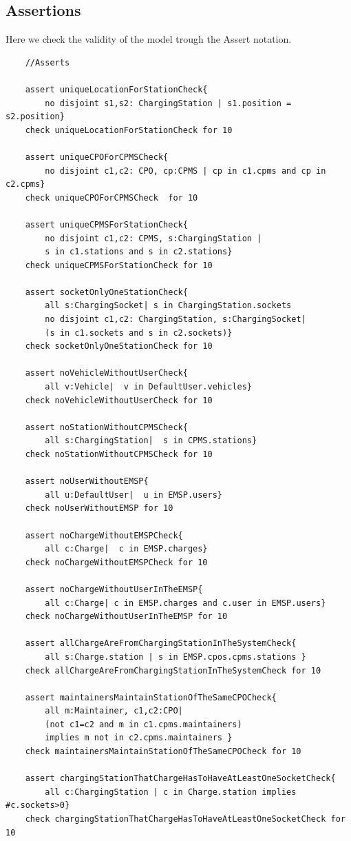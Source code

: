 \subsection{Assertions}
Here we check the validity of the model trough the Assert notation.
\begin{verbatim}
    //Asserts

    assert uniqueLocationForStationCheck{
        no disjoint s1,s2: ChargingStation | s1.position = s2.position}
    check uniqueLocationForStationCheck for 10
    
    assert uniqueCPOForCPMSCheck{
        no disjoint c1,c2: CPO, cp:CPMS | cp in c1.cpms and cp in c2.cpms}
    check uniqueCPOForCPMSCheck  for 10
    
    assert uniqueCPMSForStationCheck{
        no disjoint c1,c2: CPMS, s:ChargingStation | 
        s in c1.stations and s in c2.stations}
    check uniqueCPMSForStationCheck for 10
    
    assert socketOnlyOneStationCheck{
        all s:ChargingSocket| s in ChargingStation.sockets
        no disjoint c1,c2: ChargingStation, s:ChargingSocket|
        (s in c1.sockets and s in c2.sockets)}
    check socketOnlyOneStationCheck for 10
    
    assert noVehicleWithoutUserCheck{
        all v:Vehicle|  v in DefaultUser.vehicles}
    check noVehicleWithoutUserCheck for 10
    
    assert noStationWithoutCPMSCheck{
        all s:ChargingStation|  s in CPMS.stations}
    check noStationWithoutCPMSCheck for 10
    
    assert noUserWithoutEMSP{
        all u:DefaultUser|  u in EMSP.users}
    check noUserWithoutEMSP for 10
    
    assert noChargeWithoutEMSPCheck{
        all c:Charge|  c in EMSP.charges}
    check noChargeWithoutEMSPCheck for 10
    
    assert noChargeWithoutUserInTheEMSP{
        all c:Charge| c in EMSP.charges and c.user in EMSP.users}
    check noChargeWithoutUserInTheEMSP for 10
    
    assert allChargeAreFromChargingStationInTheSystemCheck{
        all s:Charge.station | s in EMSP.cpos.cpms.stations }
    check allChargeAreFromChargingStationInTheSystemCheck for 10
    
    assert maintainersMaintainStationOfTheSameCPOCheck{
        all m:Maintainer, c1,c2:CPO|
        (not c1=c2 and m in c1.cpms.maintainers) 
        implies m not in c2.cpms.maintainers }
    check maintainersMaintainStationOfTheSameCPOCheck for 10
    
    assert chargingStationThatChargeHasToHaveAtLeastOneSocketCheck{
        all c:ChargingStation | c in Charge.station implies #c.sockets>0}
    check chargingStationThatChargeHasToHaveAtLeastOneSocketCheck for 10    
\end{verbatim}

